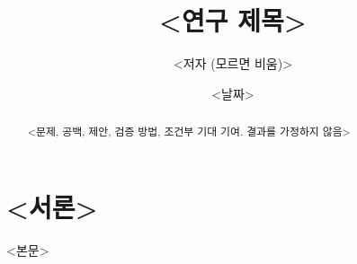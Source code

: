 \documentclass[11pt,a4paper]{article}
\title{<연구 제목>}
\author{<저자 (모르면 비움)>}
\date{<날짜>}
\begin{document}
\maketitle

\begin{abstract}
<문제, 공백, 제안, 검증 방법, 조건부 기대 기여. 결과를 가정하지 않음>
\end{abstract}

\section{<서론>}
<본문>

\end{document}
